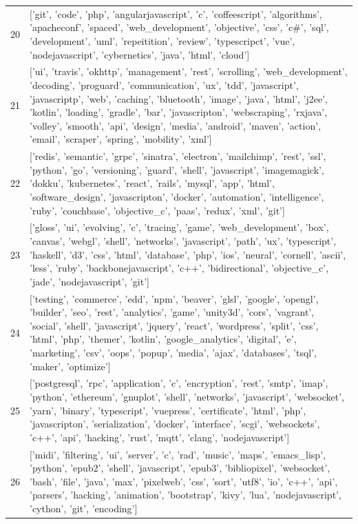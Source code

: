 \begin{center}
\begin{longtable}{|p{1.5cm}|p{12.5cm}|}
            20 & ['git', 'code', 'php', 'angularjavascript', 'c', 'coffeescript', 'algorithms', 'apacheconf', 'spaced', 'web\_development', 'objective', 'css', 'c\#', 'sql', 'development', 'uml', 'repeitition', 'review', 'typescripct', 'vue', 'nodejavascript', 'cybernetics', 'java', 'html', 'cloud']  \\ 
            21 & ['ui', 'travis', 'okhttp', 'management', 'rest', 'scrolling', 'web\_development', 'decoding', 'proguard', 'communication', 'ux', 'tdd', 'javascript', 'javascriptp', 'web', 'caching', 'bluetooth', 'image', 'java', 'html', 'j2ee', 'kotlin', 'loading', 'gradle', 'bar', 'javascripton', 'webscraping', 'rxjava', 'volley', 'smooth', 'api', 'design', 'media', 'android', 'maven', 'action', 'email', 'scraper', 'spring', 'mobility', 'xml']  \\ 
            22 & ['redis', 'semantic', 'grpc', 'sinatra', 'electron', 'mailchimp', 'rest', 'ssl', 'python', 'go', 'versioning', 'guard', 'shell', 'javascript', 'imagemagick', 'dokku', 'kubernetes', 'react', 'rails', 'mysql', 'app', 'html', 'software\_design', 'javascripton', 'docker', 'automation', 'intelligence', 'ruby', 'couchbase', 'objective\_c', 'paas', 'redux', 'xml', 'git']  \\ 
            23 & ['gloss', 'ui', 'evolving', 'c', 'tracing', 'game', 'web\_development', 'box', 'canvas', 'webgl', 'shell', 'networks', 'javascript', 'path', 'ux', 'typescript', 'haskell', 'd3', 'css', 'html', 'database', 'php', 'ios', 'neural', 'cornell', 'ascii', 'less', 'ruby', 'backbonejavascript', 'c++', 'bidirectional', 'objective\_c', 'jade', 'nodejavascript', 'git']  \\ 
            24 & ['testing', 'commerce', 'edd', 'npm', 'beaver', 'glsl', 'google', 'opengl', 'builder', 'seo', 'rest', 'analytics', 'game', 'unity3d', 'cors', 'vagrant', 'social', 'shell', 'javascript', 'jquery', 'react', 'wordpress', 'split', 'css', 'html', 'php', 'themer', 'kotlin', 'google\_analytics', 'digital', 'e', 'marketing', 'csv', 'oops', 'popup', 'media', 'ajax', 'databases', 'tsql', 'maker', 'optimize']  \\ 
            25 & ['postgresql', 'rpc', 'application', 'c', 'encryption', 'rest', 'smtp', 'imap', 'python', 'ethereum', 'gnuplot', 'shell', 'networks', 'javascript', 'websocket', 'yarn', 'binary', 'typescript', 'vuepress', 'certificate', 'html', 'php', 'javascripton', 'serialization', 'docker', 'interface', 'scgi', 'websockets', 'c++', 'api', 'hacking', 'rust', 'mqtt', 'clang', 'nodejavascript']  \\ 
            26 & ['midi', 'filtering', 'ui', 'server', 'c', 'rad', 'music', 'maps', 'emacs\_lisp', 'python', 'epub2', 'shell', 'javascript', 'epub3', 'bibliopixel', 'websocket', 'bash', 'file', 'java', 'max', 'pixelweb', 'css', 'sort', 'utf8', 'io', 'c++', 'api', 'parsers', 'hacking', 'animation', 'bootstrap', 'kivy', 'lua', 'nodejavascript', 'cython', 'git', 'encoding']  \\ 

\end{longtable}
\end{center}
